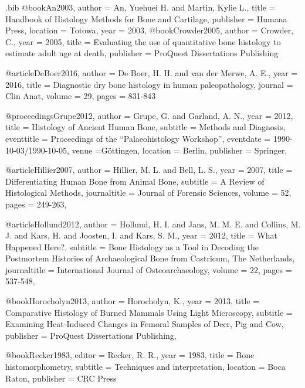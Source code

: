 \begin{filecontents}{\IJSRAidentifier.bib}
@book{An2003,
   author = {An, Yuehuei H. and Martin, Kylie L.},
   title = {Handbook of Histology Methods for Bone and Cartilage},
   publisher = {Humana Press},
   location = {Totowa},
   year = {2003},
	 }
@book{Crowder2005,
author = {Crowder, C.},
year = {2005},
title = {Evaluating the use of quantitative bone histology to estimate adult age at death},
publisher = {ProQuest Dissertations Publishing}
}

@article{DeBoer2016,
author = {De Boer, H. H. and van der Merwe, A. E.},
year = {2016},
title = {Diagnostic dry bone histology in human paleopathology},
journal = {Clin Anat}, 
volume = {29},
pages = {831-843}
}

@proceedings{Grupe2012,
author = {Grupe, G. and Garland, A. N.},
year  = {2012},
title = {Histology of Ancient Human Bone},
subtitle = {Methods and Diagnosis},
eventtitle = {Proceedings of the “Palaeohistology Workshop”},
eventdate = {1990-10-03/1990-10-05},
venue ={Göttingen}, 
location = {Berlin},
publisher = {Springer},
}

@article{Hillier2007,
author = {Hillier, M. L. and Bell, L. S.},
year = {2007},
title = {Differentiating Human Bone from Animal Bone},
subtitle = {A Review of Histological Methods},
journaltitle = {Journal of Forensic Sciences},
volume = {52}, 
pages = {249-263},
}

@article{Hollund2012,
author = {Hollund, H. I. and  Jans, M. M. E. and  Collins, M. J. and Kars, H. and  Joosten, I. and Kars, S. M.},
year = {2012},
title = {What Happened Here?},
subtitle = {Bone Histology as a Tool in Decoding the Postmortem Histories of Archaeological Bone from Castricum, The Netherlands},
journaltitle = {International Journal of Osteoarchaeology}, 
volume = {22}, 
pages = {537-548},
}

@book{Horocholyn2013,
author = {Horocholyn, K.},
year = {2013},
title = {Comparative Histology of Burned Mammals Using Light Microscopy},
subtitle = {Examining Heat-Induced Changes in Femoral Samples of Deer, Pig and Cow},
publisher = {ProQuest Dissertations Publishing},
}

@book{Recker1983,
editor = {Recker, R. R.},
year = {1983},
title = {Bone histomorphometry},
subtitle = {Techniques and interpretation},
location = {Boca Raton},
publisher = {CRC Press}
}
\end{filecontents}
\IJSRAopening%
